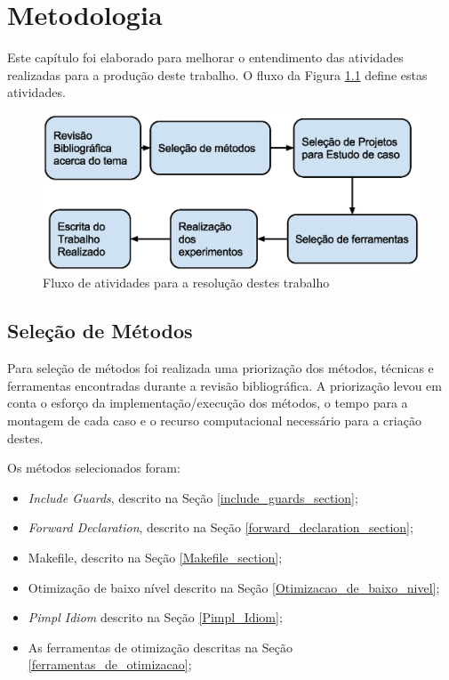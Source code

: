 \chapter[Metodologia]{Metodologia}

Este capítulo foi elaborado para melhorar o entendimento das atividades
 realizadas para a produção deste trabalho. O fluxo da Figura 
\ref{fig:fases_metodologia} define estas atividades.

\begin{figure}[h]
    \centering
        \includegraphics[keepaspectratio=true,scale=0.7]{figuras/fases_metodologia.eps}
    \caption{Fluxo de atividades para a resolução destes trabalho}
    \label{fig:fases_metodologia}
\end{figure}

\section{Seleção de Métodos}

Para seleção de métodos foi realizada uma priorização dos métodos, técnicas e
 ferramentas encontradas durante a revisão bibliográfica. A priorização levou
 em conta o esforço da implementação/execução dos métodos, o tempo para a
 montagem de cada caso e o recurso computacional necessário para a criação
 destes.

Os métodos selecionados foram:

\begin{itemize}
	\item \textit{Include Guards}, descrito na Seção
 \ref{include_guards_section};
	\item \textit{Forward Declaration}, descrito na Seção
 \ref{forward_declaration_section};
	\item Makefile, descrito na Seção
 \ref{Makefile_section};
	\item Otimização de baixo nível descrito na Seção
 \ref{Otimizacao_de_baixo_nivel};
	\item \textit{Pimpl Idiom} descrito na Seção
 \ref{Pimpl_Idiom};
	\item As ferramentas de otimização descritas na Seção
 \ref{ferramentas_de_otimizacao};
\end{itemize}

